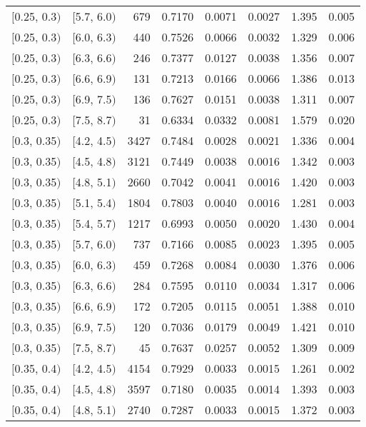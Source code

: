 \begin{longtable}{| l | l | r | r | r | r | r | r |}
        $[$0.25, 0.3$)$ & $[$5.7, 6.0$)$ & 679 & 0.7170 & 0.0071 & 0.0027 & 1.395 & 0.005 \\
        $[$0.25, 0.3$)$ & $[$6.0, 6.3$)$ & 440 & 0.7526 & 0.0066 & 0.0032 & 1.329 & 0.006 \\
        $[$0.25, 0.3$)$ & $[$6.3, 6.6$)$ & 246 & 0.7377 & 0.0127 & 0.0038 & 1.356 & 0.007 \\
        $[$0.25, 0.3$)$ & $[$6.6, 6.9$)$ & 131 & 0.7213 & 0.0166 & 0.0066 & 1.386 & 0.013 \\
        $[$0.25, 0.3$)$ & $[$6.9, 7.5$)$ & 136 & 0.7627 & 0.0151 & 0.0038 & 1.311 & 0.007 \\
        $[$0.25, 0.3$)$ & $[$7.5, 8.7$)$ & 31 & 0.6334 & 0.0332 & 0.0081 & 1.579 & 0.020 \\
        $[$0.3, 0.35$)$ & $[$4.2, 4.5$)$ & 3427 & 0.7484 & 0.0028 & 0.0021 & 1.336 & 0.004 \\
        $[$0.3, 0.35$)$ & $[$4.5, 4.8$)$ & 3121 & 0.7449 & 0.0038 & 0.0016 & 1.342 & 0.003 \\
        $[$0.3, 0.35$)$ & $[$4.8, 5.1$)$ & 2660 & 0.7042 & 0.0041 & 0.0016 & 1.420 & 0.003 \\
        $[$0.3, 0.35$)$ & $[$5.1, 5.4$)$ & 1804 & 0.7803 & 0.0040 & 0.0016 & 1.281 & 0.003 \\
        $[$0.3, 0.35$)$ & $[$5.4, 5.7$)$ & 1217 & 0.6993 & 0.0050 & 0.0020 & 1.430 & 0.004 \\
        $[$0.3, 0.35$)$ & $[$5.7, 6.0$)$ & 737 & 0.7166 & 0.0085 & 0.0023 & 1.395 & 0.005 \\
        $[$0.3, 0.35$)$ & $[$6.0, 6.3$)$ & 459 & 0.7268 & 0.0084 & 0.0030 & 1.376 & 0.006 \\
        $[$0.3, 0.35$)$ & $[$6.3, 6.6$)$ & 284 & 0.7595 & 0.0110 & 0.0034 & 1.317 & 0.006 \\
        $[$0.3, 0.35$)$ & $[$6.6, 6.9$)$ & 172 & 0.7205 & 0.0115 & 0.0051 & 1.388 & 0.010 \\
        $[$0.3, 0.35$)$ & $[$6.9, 7.5$)$ & 120 & 0.7036 & 0.0179 & 0.0049 & 1.421 & 0.010 \\
        $[$0.3, 0.35$)$ & $[$7.5, 8.7$)$ & 45 & 0.7637 & 0.0257 & 0.0052 & 1.309 & 0.009 \\
        $[$0.35, 0.4$)$ & $[$4.2, 4.5$)$ & 4154 & 0.7929 & 0.0033 & 0.0015 & 1.261 & 0.002 \\
        $[$0.35, 0.4$)$ & $[$4.5, 4.8$)$ & 3597 & 0.7180 & 0.0035 & 0.0014 & 1.393 & 0.003 \\
        $[$0.35, 0.4$)$ & $[$4.8, 5.1$)$ & 2740 & 0.7287 & 0.0033 & 0.0015 & 1.372 & 0.003 \\

\end{longtable}
